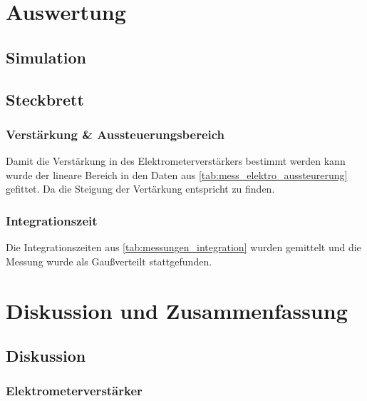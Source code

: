 \documentclass[12pt,english,ngerman]{scrartcl}
\begin{document}
\section{Auswertung}\label{sec:Auswertung}

\subsection{Simulation}

\subsection{Steckbrett}

\subsubsection{Verstärkung \& Aussteuerungsbereich}
Damit die Verstärkung in des Elektrometerverstärkers bestimmt werden kann wurde
der lineare Bereich in den Daten aus \autoref{tab:mess_elektro_aussteurerung}
gefittet. Da die Steigung der Vertärkung entspricht zu finden.
\subsubsection{Integrationszeit}
Die Integrationszeiten aus \autoref{tab:messungen_integration} wurden gemittelt
und die Messung wurde als Gaußverteilt stattgefunden.

\section{Diskussion und Zusammenfassung}\label{sec:Diskussion} 
\subsection{Diskussion}
\subsubsection{Elektrometerverstärker}
\end{document}
